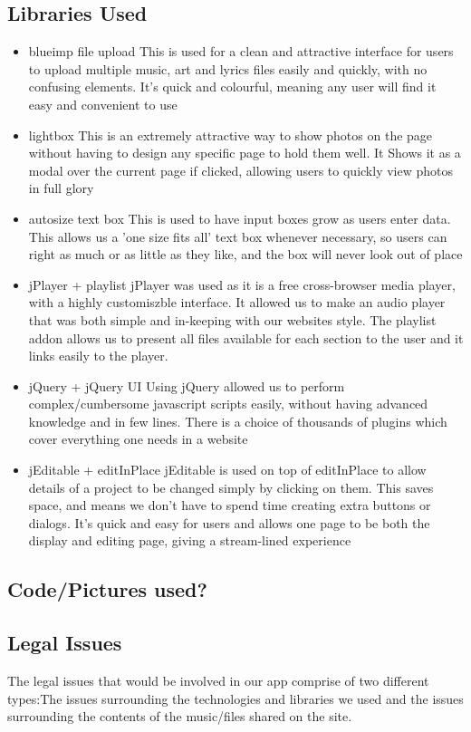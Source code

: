 \documentclass{article}
\begin{document}
\subsection{Libraries Used}
\begin{itemize}
\item blueimp file upload
This is used for a clean and attractive interface for users to upload multiple music, art and lyrics files easily and quickly, with no confusing elements. It's quick and colourful, meaning any user will find it easy and convenient to use
\item lightbox
This is an extremely attractive way to show photos on the page without having to design any specific page to hold them well. It Shows it as a modal over the current page if clicked, allowing users to quickly view photos in full glory
\item autosize text box
This is used to have input boxes grow as users enter data. This allows us a 'one size fits all' text box whenever necessary, so users can right as much or as little as they like, and the box will never look out of place
\item jPlayer + playlist
jPlayer was used as it is a free cross-browser media player, with a highly customiszble interface. It allowed us to make an audio player that was both simple and in-keeping with our websites style. The playlist addon allows us to present all files available for each section to the user and it links easily to the player.
\item jQuery + jQuery UI
Using jQuery allowed us to perform complex/cumbersome javascript scripts easily, without having advanced knowledge and in few lines. There is a choice of thousands of plugins which cover everything one needs in a website
\item jEditable + editInPlace 
jEditable is used on top of editInPlace to allow details of a project to be changed simply by clicking on them. This saves space, and means we don't have to spend time creating extra buttons or dialogs. It's quick and easy for users and allows one page to be both the display and editing page, giving a stream-lined experience
\end{itemize}

\subsection{Code/Pictures used?}
\subsection{Legal Issues}
The legal issues that would be involved in our app comprise of two different types:The issues surrounding the technologies and libraries we used and the issues surrounding the contents of the music/files shared on the site.
\end{document}
